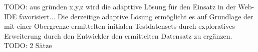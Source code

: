 TODO: aus gründen x,y,z wird die adapttive Lösung für den Einsatz in der Web-IDE favorisiert...
Die derzeitige adaptive Lösung ermöglicht es auf Grundlage der mit einer Obergrenze ermittelten initialen Testdatensets durch exploratives Erweiterung durch den Entwickler den ermittelten Datensatz zu ergänzen.
TODO: 2 Sätze


